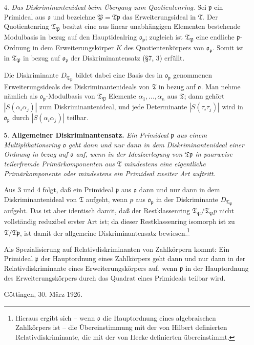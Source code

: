 \documentclass[11pt]{article}
\providecommand{\mT}{\mathfrak{T}}
\providecommand{\mo}{\mathfrak{o}}
\providecommand{\mP}{\mathfrak{P}}
\providecommand{\mpideal}{\mathfrak{p}}
\begin{document}
4. \emph{Das Diskriminantenideal beim Übergang zum Quotientenring.} Sei $\mpideal$ ein Primideal aus $\mo$ und bezeichne $\mP=\mT\mpideal$ das Erweiterungsideal in $\mT$. Der Quotientenring $\mT_\mP$ besitzt eine aus linear unabhängigen Elementen bestehende Modulbasis in bezug auf den Hauptidealring $\mo_\mpideal$; zugleich ist $\mT_\mP$ eine endliche $\mpideal$-Ordnung in dem Erweiterungskörper $K$ des Quotientenkörpers von $\mo_\mpideal$. Somit ist in $\mT_\mP$ in bezug auf $\mo_\mpideal$ der Diskriminantensatz (§7, 3) erfüllt.

Die Diskriminante $D_{\mT_\mP}$ bildet dabei eine Basis des in $\mo_\mpideal$ genommenen Erweiterungsideals des Diskriminantenideals von $\mT$ in bezug auf $\mo$. Man nehme nämlich als $\mo_\mpideal$-Modulbasis von $\mT_\mP$ Elemente $\alpha_1,\ldots,\alpha_n$ aus $\mT$; dann gehört $|S(\alpha_i\alpha_j)|$ zum Diskriminantenideal, und jede Determinante $|S(\tau_i\tau_j)|$ wird in $\mo_\mpideal$ durch $|S(\alpha_i\alpha_j)|$ teilbar.

5. \textbf{Allgemeiner Diskriminantensatz.} \emph{Ein Primideal $\mpideal$ aus einem Multiplikationsring $\mo$ geht dann und nur dann in dem Diskriminantenideal einer Ordnung in bezug auf $\mo$ auf, wenn in der Idealzerlegung von $\mT\mpideal$ in paarweise teilerfremde Primärkomponenten aus $\mT$ mindestens eine eigentliche Primärkomponente oder mindestens ein Primideal zweiter Art auftritt.}

Aus 3 und 4 folgt, daß ein Primideal $\mpideal$ aus $\mo$ dann und nur dann in dem Diskriminantenideal von $\mT$ aufgeht, wenn $p$ aus $\mo_\mpideal$ in der Diskriminante $D_{\mT_\mP}$ aufgeht. Das ist aber identisch damit, daß der Restklassenring $\mT_\mP/\mT_\mP p$ nicht vollständig reduzibel erster Art ist; da dieser Restklassenring isomorph ist zu $\mT/\mT\mpideal$, ist damit der allgemeine Diskriminantensatz bewiesen.\footnote{Hieraus ergibt sich -- wenn $\mo$ die Hauptordnung eines algebraischen Zahlkörpers ist -- die Übereinstimmung mit der von Hilbert definierten Relativdiskriminante, die mit der von Hecke definierten übereinstimmt.}

Als Spezialisierung auf Relativdiskriminanten von Zahlkörpern kommt: Ein Primideal $\mpideal$ der Hauptordnung eines Zahlkörpers geht dann und nur dann in der Relativdiskriminante eines Erweiterungskörpers auf, wenn $\mpideal$ in der Hauptordnung des Erweiterungskörpers durch das Quadrat eines Primideals teilbar wird.

Göttingen, 30. März 1926.
\end{document}

